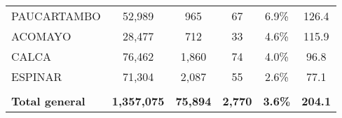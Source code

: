 \begin{tabular}{lccccc}
	\cellcolor[HTML]{FFE699}PAUCARTAMBO                             & 52,989               & 965                        & 67                   & 6.9\%                      & 126.4                                       \\
	\cellcolor[HTML]{FFE699}ACOMAYO                                 & 28,477               & 712                        & 33                   & 4.6\%                      & 115.9                                       \\
	\cellcolor[HTML]{FFE699}CALCA                                   & 76,462               & 1,860                      & 74                   & 4.0\%                      & 96.8                                        \\
	\cellcolor[HTML]{FFE699}ESPINAR                                 & 71,304               & 2,087                      & 55                   & 2.6\%                      & 77.1                                        \\
	& \multicolumn{1}{l}{} & \multicolumn{1}{l}{}       & \multicolumn{1}{l}{} & \multicolumn{1}{l}{}       & \multicolumn{1}{l}{}                        \\
	\rowcolor[HTML]{DDEBF7} 
	\textbf{Total general}                                          & \textbf{1,357,075}   & \textbf{75,894}            & \textbf{2,770}       & \textbf{3.6\%}             & \textbf{204.1}                             
\end{tabular}